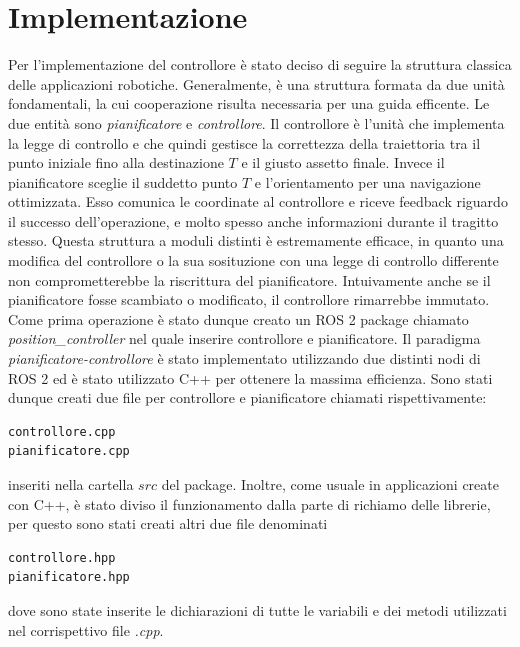 \documentclass[a4paper,11 pt,oneside]{book}
\theoremstyle{definition}
\begin{document}
\section{Implementazione}
Per l'implementazione del controllore è stato deciso di seguire la struttura classica delle applicazioni robotiche. Generalmente, è una struttura formata da due unità fondamentali, la cui cooperazione risulta necessaria per una guida efficente.
Le due entità sono \emph{pianificatore} e \emph{controllore}. Il controllore è l'unità che implementa la legge di controllo e che quindi gestisce la correttezza della traiettoria tra il punto iniziale fino alla destinazione $T$ e il giusto assetto finale. Invece il pianificatore sceglie il suddetto punto $T$ e l'orientamento per una navigazione ottimizzata. Esso comunica le coordinate al controllore e riceve feedback riguardo il successo dell'operazione, e molto spesso anche informazioni durante il tragitto stesso. Questa struttura a moduli distinti è estremamente efficace, in quanto una modifica del controllore o la sua sosituzione con una legge di controllo differente non comprometterebbe la riscrittura del pianificatore. Intuivamente anche se il pianificatore fosse scambiato o modificato, il controllore rimarrebbe immutato.
Come prima operazione è stato dunque creato un ROS 2 package chiamato \emph{position_controller} nel quale inserire controllore e pianificatore.
Il paradigma \emph{pianificatore-controllore} è stato implementato utilizzando due distinti nodi di ROS 2 ed è stato utilizzato C++ per ottenere la massima efficienza.
Sono stati dunque creati due file per controllore e pianificatore chiamati rispettivamente:
\begin{lstlisting}
controllore.cpp 
pianificatore.cpp
\end{lstlisting} 
inseriti nella cartella $src$ del package.
Inoltre, come usuale in applicazioni create con C++, è stato diviso il funzionamento dalla parte di richiamo delle librerie, per questo sono stati creati altri due file denominati
\begin{lstlisting}
controllore.hpp 
pianificatore.hpp
\end{lstlisting}
dove sono state inserite le dichiarazioni di tutte le variabili e dei metodi utilizzati nel corrispettivo file \emph{.cpp}.
\end{document}
